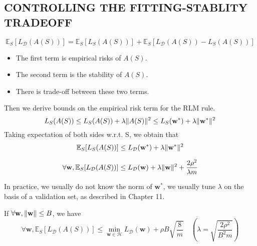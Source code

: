 \subsection{CONTROLLING THE FITTING-STABLITY TRADEOFF}

\begin{equation}
	\mathbb{E}_S[L_\mathcal{D}(A(S))] = 
	\mathbb{E}_S[L_S(A(S))] + \mathbb{E}_S[L_\mathcal{D}(A(S))-L_S(A(S))]
\end{equation}
\begin{itemize}
	\item The first term is empirical risks of $ A(S) $.
	\item The second term is the stability of $ A(S) $.
	\item There is trade-off between these two terms.
\end{itemize}

Then we derive bounds on the empirical risk term for the RLM rule.
\[ 
	L_S(A(S)) \le L_S(A(S)) + \lambda \Arrowvert A(S) \Arrowvert^2 
	\le L_S(\mathbf{w}^*) + \lambda \Arrowvert \mathbf{w}^* \Arrowvert^2
\] 
Taking expectation of both sides w.r.t. S, we obtain that
\[ 
	\mathbb{E}_S[L_S(A(S))] \le L_\mathcal{D}(\mathbf{w}^*)+\lambda \Arrowvert \mathbf{w}^* \Arrowvert^2
\]

\begin{thm}
	\[ 
		\forall \mathbf{w}, \mathbb{E}_S [L_\mathcal{D}(A(S))] \le L_\mathcal{D}(\mathbf{w}) + 
		\lambda \Arrowvert \mathbf{w} \Arrowvert^2 + \frac{2\rho^2}{\lambda m}
	\]
\end{thm}
In practice, we usually do not know the norm of $ \mathbf{w}^* $, we usually tune $ \lambda $
on the basis of a validation set, as described in Chapter 11.

If $\forall \mathbf{w}, \Arrowvert \mathbf{w} \Arrowvert \le B $, we have
\[ 
	\forall \mathbf{w}, \mathbb{E}_S [L_\mathcal{D}(A(S))] \le 
	\underset{\mathbf{w} \in \mathcal{H}}{\min} L_\mathcal{D}(\mathbf{w}) + 
	\rho B \sqrt{\frac{8}{m}} \quad
	\left(\lambda = \sqrt{\frac{2\rho^2}{B^2 m}}\right)
\]

